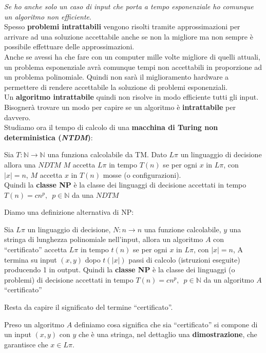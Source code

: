 \documentclass[a4paper,12pt, oneside]{book}
\begin{document}
\textit{Se ho anche solo un caso di input che porta a tempo esponenziale ho
  comunque un algoritmo non efficiente}.\\
Spesso \textbf{problemi intrattabili} vengono risolti tramite approssimazioni
per arrivare ad una soluzione accettabile anche se non la migliore ma non sempre
è possibile effettuare delle approssimazioni.\\
Anche se avessi ha che fare con un computer mille volte migliore di quelli
attuali, un problema esponenziale avrà comunque tempi non accettabili in
proporzione ad un problema polinomiale. Quindi non sarà il miglioramento
hardware a permettere di rendere accettabile la soluzione di problemi
esponenziali.\\
Un \textbf{algoritmo intrattabile} quindi non risolve in modo efficiente tutti
gli input. Bisognerà trovare un modo per capire se un algoritmo è
\textbf{intrattabile} per davvero.\\
Studiamo ora il tempo di calcolo di una \textbf{macchina di Turing non
  deterministica (\textit{NTDM})}:
\begin{definizione}
  Sia $T:\mathbb{N}\to\mathbb{N}$ una funziona calcolabile da TM. Dato $L\pi$ un
  linguaggio di decisione allora una $NDTM$ $M$ accetta $L\pi$ in tempo
  $T(n)$ se per ogni $x$ in $L\pi$, con $|x|=n$,  $M$ accetta $x$ in $T(n)$
  mosse (o configurazioni).\\
  Quindi la \textbf{classe NP} è la classe dei linguaggi di decisione accettati
  in tempo $T(n)=cn^p,\,\,\,p\in \mathbb{N}$ da una $NDTM$
\end{definizione}
Diamo una definizione alternativa di NP:
\begin{definizione}
  Sia $L\pi$ un linguaggio di decisione, $N:n\to n$ una funzione calcolabile,
  $y$ una stringa di lunghezza polinomiale nell'input, allora un algoritmo $A$
  con ``certificato'' accetta $L\pi$ in tempo $t(n)$ se per ogni $x$ in $L\pi$,
  con $|x|=n$, A termina su input $(x,y)$ dopo $t(|x|)$ passi di calcolo
  (istruzioni eseguite) producendo 1 in output.
  Quindi la \textbf{classe NP} è la classe dei linguaggi (o problemi) di
  decisione accettati in tempo $T(n)=cn^p,\,\,\,p\in\mathbb{N}$ da un algoritmo
  $A$ ``certificato''
\end{definizione}
Resta da capire il significato del termine ``certificato''.
\begin{definizione}
  Preso un algoritmo $A$ definiamo cosa significa che sia ``certificato'' si
  compone di un input $(x,y)$ con $y$ che è una stringa, nel dettaglio una
  \textbf{dimostrazione}, che garantisce che $x\in L\pi$.
\end{definizione}
\end{document}
